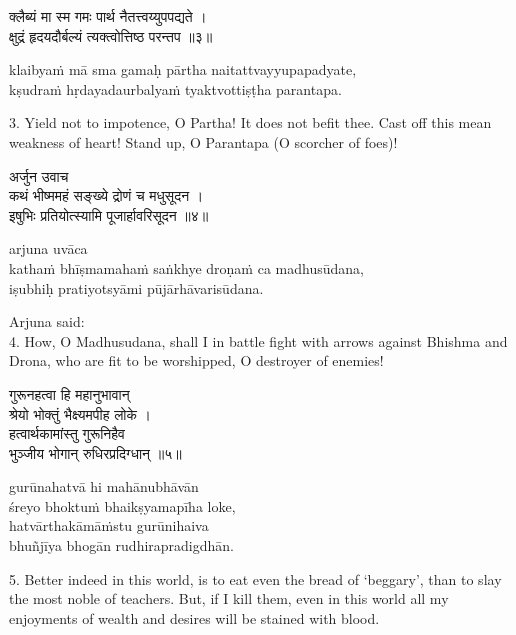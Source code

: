 \begin{gitaverse}
क्लैब्यं मा स्म गमः पार्थ नैतत्त्वय्युपपद्यते । \\
क्षुद्रं हृदयदौर्बल्यं त्यक्त्वोत्तिष्ठ परन्तप ॥३॥
\end{gitaverse}

\begin{transliteration}
klaibyaṁ mā sma gamaḥ pārtha naitattvayyupapadyate, \\
kṣudraṁ hṛdayadaurbalyaṁ tyaktvottiṣṭha parantapa.
\end{transliteration}

3. Yield not to impotence, O Partha! It does not befit thee. Cast off this mean
weakness of heart! Stand up, O Parantapa (O scorcher of foes)!

\begin{gitaverse}
अर्जुन उवाच \\
कथं भीष्ममहं सङ्ख्ये द्रोणं च मधुसूदन । \\
इषुभिः प्रतियोत्स्यामि पूजार्हावरिसूदन ॥४॥
\end{gitaverse}

\begin{transliteration}
arjuna uvāca \\
kathaṁ bhīṣmamahaṁ saṅkhye droṇaṁ ca madhusūdana, \\
iṣubhiḥ pratiyotsyāmi pūjārhāvarisūdana.
\end{transliteration}

Arjuna said: \\
4. How, O Madhusudana, shall I in battle fight with arrows against Bhishma and
Drona, who are fit to be worshipped, O destroyer of enemies!

\begin{gitaverse}
गुरूनहत्वा हि महानुभावान् \\
\tab श्रेयो भोक्तुं भैक्ष्यमपीह लोके । \\
हत्वार्थकामांस्तु गुरूनिहैव \\
\tab भुञ्जीय भोगान् रुधिरप्रदिग्धान् ॥५॥
\end{gitaverse}

\begin{transliteration}
gurūnahatvā hi mahānubhāvān \\
\tab śreyo bhoktuṁ bhaikṣyamapīha loke, \\
hatvārthakāmāṁstu gurūnihaiva \\
\tab bhuñjīya bhogān rudhirapradigdhān.
\end{transliteration}

5. Better indeed in this world, is to eat even the bread of `beggary', than to
slay the most noble of teachers. But, if I kill them, even in this world all my
enjoyments of wealth and desires will be stained with blood.

